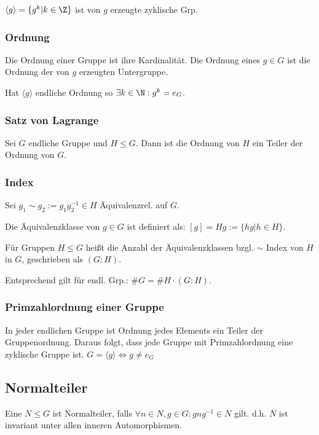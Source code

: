 $\langle g \rangle = \{ g^k | k \in \Z \}$ ist von $g$ erzeugte zyklische Grp.

\subsubsection*{Ordnung}

Die Ordnung einer Gruppe ist ihre Kardinalität. Die Ordnung eines $g \in G$ ist die Ordnung der von $g$ erzeugten Untergruppe.

Hat $\langle g \rangle$ endliche Ordnung so $\exists k \in \N : g^k = e_G$.

\subsubsection*{Satz von Lagrange}

Sei $G$ endliche Gruppe und $H \leq G$. Dann ist die Ordnung von $H$ ein Teiler der Ordnung von $G$.

\subsubsection*{Index}

Sei $g_1 \sim g_2 := g_1 g_2^{-1} \in H$ Äquivalenzrel. auf $G$.

Die Äquivalenzklasse von $g \in G$ ist definiert als: $[g] = Hg := \{ hg | h \in H\}$.

Für Gruppen $H \leq G$ heißt die Anzahl der Äquivalenzklassen bzgl. $\sim$ Index von $H$ in $G$, geschrieben als $(G : H)$.

Entsprechend gilt für endl. Grp.: $\#G = \#H \cdot (G : H)$.

\subsubsection*{Primzahlordnung einer Gruppe}

In jeder endlichen Gruppe ist Ordnung jedes Elements ein Teiler der Gruppenordnung. Daraus folgt, dass jede Gruppe mit Primzahlordnung eine zyklische Gruppe ist. $G = \langle g \rangle \iff g \neq e_G$

\subsection*{Normalteiler}

Eine $N \leq G$ ist Normalteiler, falls $\forall n \in N, g \in G : gng^{-1} \in N$ gilt. d.h. $N$ ist invariant unter allen inneren Automorphismen.

